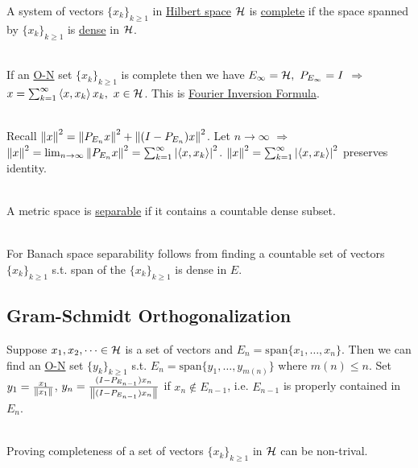 \vspace{3pt}
\begin{definition}
A system of vectors $\{x_k\}_{k \geq 1}$ in \underline{Hilbert space} $\mathcal{H}$ is \underline{complete} if the space spanned by $\{x_k\}_{k \geq 1}$ is \underline{dense} in $\mathcal{H}$.
\end{definition}
\begin{remark}\ \\
    If an \underline{O-N} set $\{x_k\}_{k \geq 1}$ is complete then we have $E_\infty = \Hs,\ P_{E_\infty} = I$ $\Rightarrow$ $x = \sum_{k=1}^\infty \left\langle x, x_k \right\rangle x_k,\ x \in \mathcal{H}$. This is \underline{Fourier Inversion Formula}. 
\end{remark}
\begin{remark}\ \\
Recall $\norm{x}^2 = \norm{P_{E_n} x}^2 + \norm{(I - P_{E_n}) x}^2$. Let $n \to \infty$ $\Rightarrow$ $\norm{x}^2 = \lim_{n \to \infty} \norm{P_{E_n} x}^2 = \sum_{k=1}^\infty \abs{\left\langle x, x_k \right\rangle}^2$. $\norm{x}^2 = \sum_{k=1}^\infty \abs{\left\langle x, x_k \right\rangle}^2$ preserves identity. 
\end{remark}


\vspace{3pt}
\begin{definition}\ \\
A metric space is \underline{separable} if it contains a countable dense subset.
\end{definition}
\begin{remark}\ \\
For Banach space separability follows from finding a countable set of vectors $\{x_k\}_{k \geq 1}$ s.t. span of the $\{x_k\}_{k \geq 1}$ is dense in $E$.
\end{remark}


\vspace{12pt}
\subsection{Gram-Schmidt Orthogonalization}

\np Suppose $x_1,x_2,\dots \in \mathcal{H}$ is a set of vectors and $E_n = \text{span}\{x_1,\dots,x_n\}$. Then we can find an \underline{O-N} set $\{y_k\}_{k \geq 1}$ s.t. $E_n = \text{span}\{y_1,\dots,y_{m(n)}\}$ where $m(n) \leq n$. Set $y_1 = \frac{x_1}{\norm{x_1}}$, $y_n = \frac{(I - P_{E_{n-1}} ) x_n}{\norm{(I - P_{E_{n-1}}) x_n}}$ if $x_n \not\in E_{n-1}$, i.e. $E_{n-1}$ is properly contained in $E_n$.
\begin{remark}\ \\
Proving completeness of a set of vectors $\{x_k\}_{k \geq 1}$ in $\mathcal{H}$ can be non-trival.
\end{remark}

